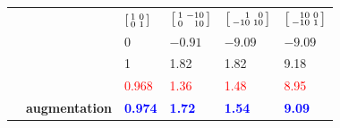 \documentclass[a4paper,12pt,%
onecolumn,oneside,article,%
british%
]{memoir}
\renewcommand*{\|}[1][]{\nonscript\:#1\vert\nonscript\:\mathopen{}}
\newcommand*{\sumatrix}[4]{\begin{bsmallmatrix*}[r]#1&#2\\#3&#4\end{bsmallmatrix*}}
\begin{document}
\begin{table}[!p]
%
  \begin{tabular*}{\linewidth}{clw{c}{0.12\linewidth}w{c}{0.12\linewidth}w{c}{0.12\linewidth}w{c}{0.12\linewidth}}
&    &$\sumatrix{1}{0}{0}{1}$
 &$\sumatrix{1}{-10}{0}{10}$
 &$\sumatrix{1}{0}{-10}{10}$
 &$\sumatrix{10}{0}{-10}{1}$
     \\[2\jot]
 &\parbox{0.21\linewidth}{}
 &\textcolor{mygray}{\footnotesize $0$}
 &\textcolor{mygray}{\footnotesize $-0.91$}
 &\textcolor{mygray}{\footnotesize $-9.09$}
 &\textcolor{mygray}{\footnotesize $-9.09$}
     \\[0\jot]
 &\parbox{0.21\linewidth}{}
 &\textcolor{mygray}{\footnotesize 1}
 &\textcolor{mygray}{\footnotesize 1.82}
 &\textcolor{mygray}{\footnotesize 1.82}
 &\textcolor{mygray}{\footnotesize 9.18}
    \\[5\jot]
 &\parbox{0.21\linewidth}{\color{red}}
 &\textcolor{red}{0.968}
 &\textcolor{red}{1.36}
 &\textcolor{red}{1.48}
 &\textcolor{red}{8.95}
 \\[1\jot]
 &\parbox{0.21\linewidth}{\color{blue}\bfseries augmentation}
 &\textcolor{blue}{\bfseries 0.974}
 &\textcolor{blue}{\bfseries 1.72}
 &\textcolor{blue}{\bfseries 1.54}
 &\textcolor{blue}{\bfseries 9.09}
 \\[5\jot]

\end{tabular*}
\end{table}
\end{document}
